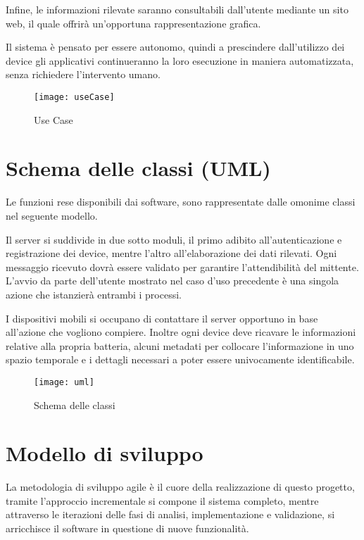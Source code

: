 \documentclass[target=bach]{thud}
\begin{document}
    Infine, le informazioni rilevate saranno consultabili dall'utente mediante un sito web, il quale offrirà un'opportuna rappresentazione grafica.

    Il sistema è pensato per essere autonomo, quindi a prescindere dall'utilizzo dei device gli applicativi continueranno la loro esecuzione in maniera automatizzata, senza richiedere l'intervento umano.


\graphicspath{ {./img/} }
\begin{figure}[h]
\centering
\texttt{[image: useCase]}
\caption{Use Case}
\label{fig:usecase}
\end{figure}


\section{Schema delle classi (UML)}

    Le funzioni rese disponibili dai software, sono rappresentate dalle omonime classi nel seguente modello.

    Il server si suddivide in due sotto moduli, il primo adibito all'autenticazione e registrazione dei device, mentre l'altro all'elaborazione dei dati rilevati. Ogni messaggio ricevuto dovrà essere validato per garantire l'attendibilità del mittente.
    L’avvio da parte dell’utente mostrato nel caso d’uso precedente è una singola azione che istanzierà entrambi i processi.


    I dispositivi mobili si occupano di contattare il server opportuno in base all'azione che vogliono compiere. Inoltre ogni device deve ricavare le informazioni relative alla propria batteria, alcuni metadati per collocare l'informazione in uno spazio temporale e i dettagli necessari a poter essere univocamente identificabile.

    \begin{figure}[h]
    	\centering
    	\texttt{[image: uml]}
    	\caption{Schema delle classi}
    	\label{fig:uml}
    \end{figure}

\newpage

\section{Modello di sviluppo}

    La metodologia di sviluppo agile è il cuore della realizzazione di questo progetto, tramite l'approccio incrementale si compone il sistema completo, mentre attraverso le iterazioni delle fasi di analisi, implementazione e validazione, si arricchisce il software in questione di nuove funzionalità.
\end{document}
